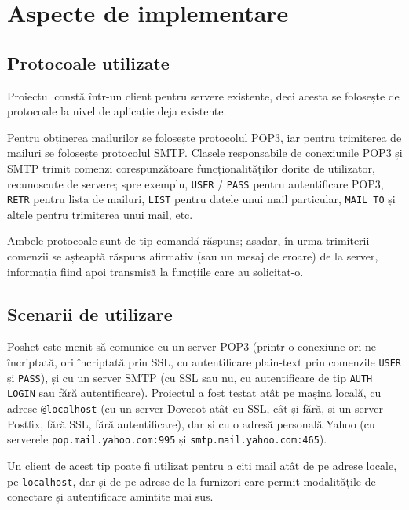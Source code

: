\documentclass[runningheads]{llncs}
\begin{document}
\newpage




\section{Aspecte de implementare}

\subsection{Protocoale utilizate}
Proiectul constă într-un client pentru servere existente, deci acesta se folosește de protocoale la nivel de aplicație deja existente.

Pentru obținerea mailurilor se folosește protocolul POP3\cite{ref_rfc_pop3}, iar pentru trimiterea de mailuri se folosește protocolul SMTP\cite{ref_rfc_smtp}. Clasele responsabile de conexiunile POP3 și SMTP trimit comenzi corespunzătoare funcționalităților dorite de utilizator, recunoscute de servere; spre exemplu, \texttt{USER} / \texttt{PASS} pentru autentificare POP3, \texttt{RETR} pentru lista de mailuri, \texttt{LIST} pentru datele unui mail particular, \texttt{MAIL TO} și altele pentru trimiterea unui mail, etc.

Ambele protocoale sunt de tip comandă-răspuns; așadar, în urma trimiterii comenzii se așteaptă răspuns afirmativ (sau un mesaj de eroare) de la server, informația fiind apoi transmisă la funcțiile care au solicitat-o.

\subsection{Scenarii de utilizare}
Poshet este menit să comunice cu un server POP3 (printr-o conexiune ori ne-încriptată, ori încriptată prin SSL, cu autentificare plain-text prin comenzile \texttt{USER} și \texttt{PASS}), și cu un server SMTP (cu SSL sau nu, cu autentificare de tip \texttt{AUTH LOGIN} sau fără autentificare). Proiectul a fost testat atât pe mașina locală, cu adrese \texttt{@localhost} (cu un server Dovecot atât cu SSL, cât și fără, și un server Postfix, fără SSL, fără autentificare), dar și cu o adresă personală Yahoo (cu serverele \texttt{pop.mail.yahoo.com:995} și \texttt{smtp.mail.yahoo.com:465}).

Un client de acest tip poate fi utilizat pentru a citi mail atât de pe adrese locale, pe \texttt{localhost}, dar și de pe adrese de la furnizori care permit modalitățile de conectare și autentificare amintite mai sus.
\end{document}
